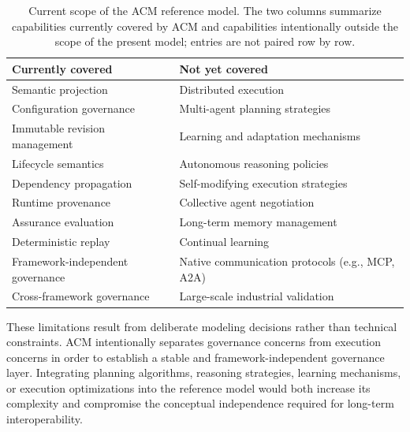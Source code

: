 \documentclass[10pt]{article}
\begin{document}
\begin{table}[t]
	\caption{Current scope of the ACM reference model. The two columns summarize capabilities currently covered by ACM and capabilities intentionally outside the scope of the present model; entries are not paired row by row.}
	\label{tab:limitations_scope}
	\centering
	\begin{tabular}{ll}
		
		\toprule
		
		Currently covered &
		Not yet covered \\
		
		\midrule
		
		Semantic projection &
		Distributed execution \\
		
		Configuration governance &
		Multi-agent planning strategies \\
		
		Immutable revision management &
		Learning and adaptation mechanisms \\
		
		Lifecycle semantics &
		Autonomous reasoning policies \\
		
		Dependency propagation &
		Self-modifying execution strategies \\
		
		Runtime provenance &
		Collective agent negotiation \\
		
		Assurance evaluation &
		Long-term memory management \\
		
		Deterministic replay &
		Continual learning \\
		
		Framework-independent governance &
		Native communication protocols (e.g., MCP, A2A) \\
		
		Cross-framework governance &
		Large-scale industrial validation \\
		
		\bottomrule
		
	\end{tabular}
	
	\end{table}

These limitations result from deliberate modeling decisions rather than technical constraints. ACM intentionally separates governance concerns from execution concerns in order to establish a stable and framework-independent governance layer. Integrating planning algorithms, reasoning strategies, learning mechanisms, or execution optimizations into the reference model would both increase its complexity and compromise the conceptual independence required for long-term interoperability.
\end{document}
